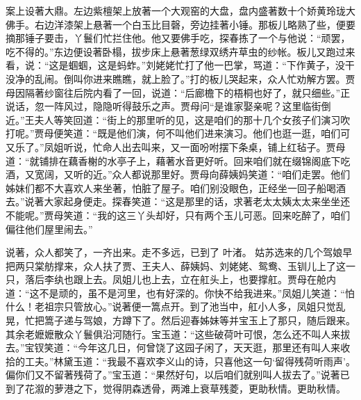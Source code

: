 \begin{parag}
    案上设著大鼎。左边紫檀架上放著一个大观窑的大盘，盘内盛著数十个娇黄玲珑大佛手。右边洋漆架上悬著一个白玉比目磬，旁边挂著小锤。那板儿略熟了些，便要摘那锤子要击，丫鬟们忙拦住他。他又要佛手吃，探春拣了一个与他说：“顽罢，吃不得的。”东边便设著卧榻，拔步床上悬著葱绿双绣卉草虫的纱帐。板儿又跑过来看，说：“这是蝈蝈，这是蚂蚱。”刘姥姥忙打了他一巴掌，骂道：“下作黄子，没干没净的乱闹。倒叫你进来瞧瞧，就上脸了。”打的板儿哭起来，众人忙劝解方罢。贾母因隔著纱窗往后院内看了一回，说道：“后廊檐下的梧桐也好了，就只细些。”正说话，忽一阵风过，隐隐听得鼓乐之声。贾母问“是谁家娶亲呢？这里临街倒近。”王夫人等笑回道：“街上的那里听的见，这是咱们的那十几个女孩子们演习吹打呢。”贾母便笑道：“既是他们演，何不叫他们进来演习。他们也逛一逛，咱们可又乐了。”凤姐听说，忙命人出去叫来，又一面吩咐摆下条桌，铺上红毡子。贾母道：“就铺排在藕香榭的水亭子上，藉著水音更好听。回来咱们就在缀锦阁底下吃酒，又宽阔，又听的近。”众人都说那里好。贾母向薛姨妈笑道：“咱们走罢。他们姊妹们都不大喜欢人来坐著，怕脏了屋子。咱们别没眼色，正经坐一回子船喝酒去。”说著大家起身便走。探春笑道：“这是那里的话，求著老太太姨太太来坐坐还不能呢。”贾母笑道：“我的这三丫头却好，只有两个玉儿可恶。回来吃醉了，咱们偏往他们屋里闹去。”
\end{parag}


\begin{parag}
    说著，众人都笑了，一齐出来。走不多远，已到了 叶渚。 姑苏选来的几个驾娘早把两只棠舫撑来，众人扶了贾、王夫人、薛姨妈、刘姥姥、鸳鸯、玉钏儿上了这一只，落后李纨也跟上去。凤姐儿也上去，立在舡头上，也要撑舡。贾母在舱内道：“这不是顽的，虽不是河里，也有好深的。你快不给我进来。”凤姐儿笑道：“怕什么！老祖宗只管放心。”说著便一篙点开。到了池当中，舡小人多，凤姐只觉乱晃，忙把篙子递与驾娘，方蹲下了。然后迎春姊妹等并宝玉上了那只，随后跟来。其余老嬷嬷散众丫鬟俱沿河随行。宝玉道：“这些破荷叶可恨，怎么还不叫人来拔去。”宝钗笑道：“今年这几日，何曾饶了这园子闲了，天天逛，那里还有叫人来收拾的工夫。”林黛玉道：“我最不喜欢李义山的诗，只喜他这一句‘留得残荷听雨声’。偏你们又不留著残荷了。”宝玉道：“果然好句，以后咱们就别叫人拔去了。”说著已到了花溆的萝港之下，觉得阴森透骨，两滩上衰草残菱，更助秋情。更助秋情。
\end{parag}


